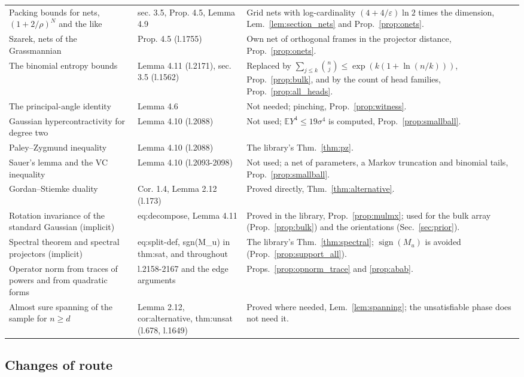 \documentclass[11pt]{article}
\newcommand{\E}{\mathbb{E}}
\newcommand{\sign}{\operatorname{sign}}
\theoremstyle{plain}
\theoremstyle{definition}
\begin{document}
\begin{longtable}{@{}>{\raggedright\arraybackslash}p{42mm}>{\raggedright\arraybackslash}p{32mm}>{\raggedright\arraybackslash}p{72mm}@{}}
Packing bounds for nets, $(1 + 2/\rho)^N$ and the like & sec. 3.5, Prop. 4.5, Lemma 4.9 & Grid nets with log-cardinality $(4 + 4/\varepsilon)\ln 2$ times the dimension, Lem.~\ref{lem:section_nets} and Prop.~\ref{prop:onets}.\\
Szarek, nets of the Grassmannian & Prop. 4.5 (l.1755) & Own net of orthogonal frames in the projector distance, Prop.~\ref{prop:onets}.\\
The binomial entropy bounds & Lemma 4.11 (l.2171), sec. 3.5 (l.1562) & Replaced by $\sum_{j \le k}\binom nj \le \exp(k(1 + \ln(n/k)))$, Prop.~\ref{prop:bulk}, and by the count of head families, Prop.~\ref{prop:all_heads}.\\
The principal-angle identity & Lemma 4.6 & Not needed; pinching, Prop.~\ref{prop:witness}.\\
Gaussian hypercontractivity for degree two & Lemma 4.10 (l.2088) & Not used; $\E Y^4 \le 19\sigma^4$ is computed, Prop.~\ref{prop:smallball}.\\
Paley--Zygmund inequality & Lemma 4.10 (l.2088) & The library's Thm.~\ref{thm:pz}.\\
Sauer's lemma and the VC inequality & Lemma 4.10 (l.2093-2098) & Not used; a net of parameters, a Markov truncation and binomial tails, Prop.~\ref{prop:smallball}.\\
Gordan--Stiemke duality & Cor. 1.4, Lemma 2.12 (l.173) & Proved directly, Thm.~\ref{thm:alternative}.\\
Rotation invariance of the standard Gaussian (implicit) & eq:decompose, Lemma 4.11 & Proved in the library, Prop.~\ref{prop:mulmx}; used for the bulk array (Prop.~\ref{prop:bulk}) and the orientations (Sec.~\ref{sec:prior}).\\
Spectral theorem and spectral projectors (implicit) & eq:split-def, sgn(M\_u) in thm:sat, and throughout & The library's Thm.~\ref{thm:spectral}; $\sign(M_u)$ is avoided (Prop.~\ref{prop:support_all}).\\
Operator norm from traces of powers and from quadratic forms & l.2158-2167 and the edge arguments & Props.~\ref{prop:opnorm_trace} and \ref{prop:abab}.\\
Almost sure spanning of the sample for $n \ge d$ & Lemma 2.12, cor:alternative, thm:unsat (l.678, l.1649) & Proved where needed, Lem.~\ref{lem:spanning}; the unsatisfiable phase does not need it.\\
\end{longtable}
\endgroup

\subsection{Changes of route}\label{sec:corr_routes}
\end{document}
